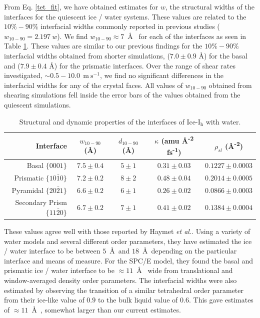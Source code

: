 From Eq. \eqref{tet_fit}, we have obtained estimates for $w$, the
structural widths of the interfaces for the quiescent ice / water
systems. These values are related to the $10\%-90\%$ interfacial
widths commonly reported in previous studies
($w_\mathrm{10-90} = 2.197~w$).\cite{Bryk2002,Bryk2004} We find
$w_\mathrm{10-90} \approx 7$~\AA~ for each of the interfaces as seen
in Table \ref{tab:kappa}.  These values are similar to our previous
findings for the $10\%-90\%$ interfacial widths obtained from shorter
simulations, ($7.0 \pm 0.9$ \AA) for the basal and ($7.9 \pm 0.4$ \AA)
for the prismatic interfaces.\cite{Louden2013} Over the range of shear
rates investigated, $\sim 0.5-10.0~\mathrm{~m~s}^{-1}$, we find no
significant differences in the interfacial widths for any of the
crystal faces. All values of $w_\mathrm{10-90}$ obtained from shearing
simulations fell inside the error bars of the values obtained from the
quiescent simulations.

\begin{table}[h]
\centering
\caption{Structural and dynamic properties of the interfaces of
  Ice-I$_\mathrm{h}$ with water.\label{tab:kappa}}
\begin{tabular}{r|cccc}  
\toprule
Interface & $w_\mathrm{10-90}$ (\AA) &  $d_\mathrm{10-90}$ (\AA) & $\kappa$ (amu \AA\textsuperscript{-2} fs\textsuperscript{-1}) & $\rho_{sl}$ (\AA\textsuperscript{-2}) \\ 
\midrule
Basal  $\{0001\}$                 & $7.5 \pm 0.4$ & $5 \pm 1$ &  $0.31 \pm 0.03$  & $0.1227 \pm 0.0003$  \\
Prismatic  $\{10\bar{1}0\}$       & $7.2 \pm 0.2$ & $8 \pm 2$  &  $0.48 \pm 0.04$  & $0.2014 \pm 0.0005$  \\
Pyramidal  $\{20\bar{2}1\}$       & $6.6 \pm 0.2$ & $6 \pm 1$ &  $0.26 \pm 0.02$  & $0.0866 \pm 0.0003$  \\
Secondary Prism  $\{11\bar{2}0\}$ & $6.7 \pm 0.2$ & $7 \pm 1$ &  $0.41 \pm 0.02$  & $0.1384 \pm 0.0004$  \\ 
\bottomrule
\end{tabular}
\end{table}

These values agree well with those reported by Haymet \textit{et
  al.}.\cite{Karim1988,Karim1990,Hayward2001,Bryk2002,Hayward2002,Bryk2004}
Using a variety of water models and several different order
parameters, they have estimated the ice / water interface to be
between $5$~\AA~and $18$~\AA~depending on the particular interface and
means of measure.  For the SPC/E model, they found the basal and
prismatic ice / water interface to be $\approx 11$~\AA~ wide from
translational and window-averaged density order parameters. The
interfacial widths were also estimated by observing the transition of
a similar tetrahedral order parameter from their ice-like value of
$0.9$ to the bulk liquid value of $0.6$. This gave estimates of
$\approx 11$~\AA~, somewhat larger than our current estimates.

